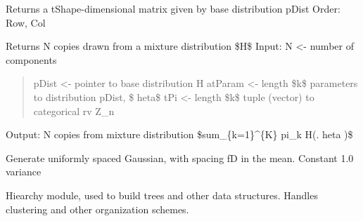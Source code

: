 \documentclass[letterpaper,10pt,english]{sphinxmanual}
\begin{document}
\begin{fulllineitems}
\end{fulllineitems}


\begin{fulllineitems}
\label{index:halla.test.randmat}
Returns a tShape-dimensional matrix given by base distribution pDist 
Order: Row, Col

\end{fulllineitems}


\begin{fulllineitems}
\label{index:halla.test.randmix}
Returns N copies drawn from a mixture distribution \$H\$ 
Input: N \textless{}- number of components
\begin{quote}

pDist \textless{}- pointer to base distribution H 
atParam \textless{}- length \$k\$ parameters to distribution pDist, \$       heta\$  
tPi \textless{}- length \$k\$ tuple (vector) to categorical rv Z\_n
\end{quote}

Output: N copies from mixture distribution \$sum\_\{k=1\}\textasciicircum{}\{K\} pi\_k H(.\textbar{}   heta )\$

\end{fulllineitems}


\begin{fulllineitems}
\label{index:halla.test.uniformly_spaced_gaussian}
Generate uniformly spaced Gaussian, with spacing fD in the mean.
Constant 1.0 variance

\end{fulllineitems}

\label{index:module-halla.hierarchy}
Hiearchy module, used to build trees and other data structures.
Handles clustering and other organization schemes.
\end{document}
